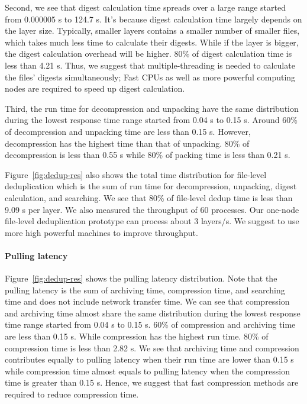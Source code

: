 Second, we see that digest calculation time spreads over a large range started
from 0.000005 s to 124.7 s. It's because digest calculation time largely
depends on the layer size. Typically, smaller layers contains a smaller number
of smaller files, which takes much less time to calculate their digests. While
if the layer is bigger, the digest calculation overhead will be higher. 80\% of
digest calculation time is less than 4.21 s. 
Thus, we suggest that multiple-threading is needed to calculate the files'
digests simultaneously; Fast CPUs as well as more powerful computing nodes are
required to speed up digest calculation.

Third, the run time for decompression and unpacking have the same distribution
during the lowest response time range started from 0.04 s to 0.15 s. Around
60\% of decompression and unpacking time are less than 0.15 s. However,
decompression has the highest time than that of unpacking. 80\% of
decompression is less than 0.55 s while 80\% of packing time is less than 0.21 s. 

Figure~\ref{fig:dedup-res} also shows the total time distribution for
file-level deduplication which is the sum of run time for decompression, unpacking,
digest calculation, and searching. We see that 80\% of file-level dedup time is
less than 9.09 s per layer.
%
%
We also measured the throughput of 60 processes. Our one-node file-level
deduplication prototype can process about 3 layers/s. We suggest to use more
high powerful machines to improve throughput.

\paragraph{Pulling latency} Figure~\ref{fig:dedup-res} shows the pulling latency
distribution. Note that the pulling latency is the sum of archiving time,
compression time, and searching time and does not include network transfer
time. We can see that compression and archiving time almost share the same
distribution during the lowest response time range started from 0.04 s to 0.15
s. 60\% of compression and archiving time are less than 0.15 s. While
compression has the highest run time. 80\% of compression time is less than 2.82
s. We see that archiving time and compression contributes equally to pulling
latency when their run time are lower than 0.15 s while compression time almost
equals to pulling latency when the compression time is greater than 0.15 s. Hence, we
suggest that fast compression methods are required to reduce compression time.  
%


